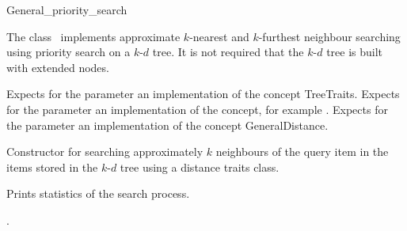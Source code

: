 

\begin{ccRefClass}{General_priority_search}  %


\ccDefinition

The class \ccRefName\ implements approximate $k$-nearest and $k$-furthest neighbour searching
using priority search on a $k$-$d$ tree. It is not required that the $k$-$d$ tree is
built with extended nodes.



\ccParameters

Expects for the parameter  an implementation of the concept TreeTraits.
Expects for the parameter   an implementation of the
 concept, for example .
Expects for the parameter  an implementation of the
concept GeneralDistance.

\ccTypes



\ccCreation
{}  %

{Constructor for searching approximately $k$ neighbours of the query item 
in the items stored in the $k$-$d$ tree  using a distance
traits class.}




{
Prints statistics of the search process.
}

\ccSeeAlso

.


\end{ccRefClass}


